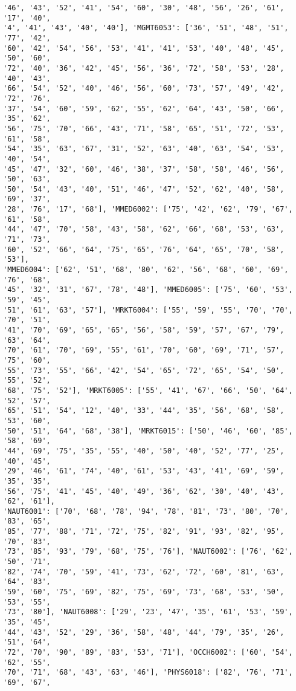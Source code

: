 \documentclass[11pt]{article}
\begin{document}
\begin{Verbatim}[commandchars=\\\{\}]
'46', '43', '52', '41', '54', '60', '30', '48', '56', '26', '61', '17', '40',
'4', '41', '43', '40', '40'], 'MGMT6053': ['36', '51', '48', '51', '77', '42',
'60', '42', '54', '56', '53', '41', '41', '53', '40', '48', '45', '50', '60',
'72', '40', '36', '42', '45', '56', '36', '72', '58', '53', '28', '40', '43',
'66', '54', '52', '40', '46', '56', '60', '73', '57', '49', '42', '72', '76',
'37', '54', '60', '59', '62', '55', '62', '64', '43', '50', '66', '35', '62',
'56', '75', '70', '66', '43', '71', '58', '65', '51', '72', '53', '61', '58',
'54', '35', '63', '67', '31', '52', '63', '40', '63', '54', '53', '40', '54',
'45', '47', '32', '60', '46', '38', '37', '58', '58', '46', '56', '50', '63',
'50', '54', '43', '40', '51', '46', '47', '52', '62', '40', '58', '69', '37',
'28', '76', '17', '68'], 'MMED6002': ['75', '42', '62', '79', '67', '61', '58',
'44', '47', '70', '58', '43', '58', '62', '66', '68', '53', '63', '71', '73',
'60', '52', '66', '64', '75', '65', '76', '64', '65', '70', '58', '53'],
'MMED6004': ['62', '51', '68', '80', '62', '56', '68', '60', '69', '76', '68',
'45', '32', '31', '67', '78', '48'], 'MMED6005': ['75', '60', '53', '59', '45',
'51', '61', '63', '57'], 'MRKT6004': ['55', '59', '55', '70', '70', '70', '51',
'41', '70', '69', '65', '65', '56', '58', '59', '57', '67', '79', '63', '64',
'70', '61', '70', '69', '55', '61', '70', '60', '69', '71', '57', '75', '60',
'55', '73', '55', '66', '42', '54', '65', '72', '65', '54', '50', '55', '52',
'68', '75', '52'], 'MRKT6005': ['55', '41', '67', '66', '50', '64', '52', '57',
'65', '51', '54', '12', '40', '33', '44', '35', '56', '68', '58', '53', '60',
'50', '51', '64', '68', '38'], 'MRKT6015': ['50', '46', '60', '85', '58', '69',
'44', '69', '75', '35', '55', '40', '50', '40', '52', '77', '25', '40', '45',
'29', '46', '61', '74', '40', '61', '53', '43', '41', '69', '59', '35', '35',
'56', '75', '41', '45', '40', '49', '36', '62', '30', '40', '43', '62', '61'],
'NAUT6001': ['70', '68', '78', '94', '78', '81', '73', '80', '70', '83', '65',
'85', '77', '88', '71', '72', '75', '82', '91', '93', '82', '95', '70', '83',
'73', '85', '93', '79', '68', '75', '76'], 'NAUT6002': ['76', '62', '50', '71',
'82', '74', '70', '59', '41', '73', '62', '72', '60', '81', '63', '64', '83',
'59', '60', '75', '69', '82', '75', '69', '73', '68', '53', '50', '53', '55',
'73', '80'], 'NAUT6008': ['29', '23', '47', '35', '61', '53', '59', '35', '45',
'44', '43', '52', '29', '36', '58', '48', '44', '79', '35', '26', '51', '64',
'72', '70', '90', '89', '83', '53', '71'], 'OCCH6002': ['60', '54', '62', '55',
'70', '71', '68', '43', '63', '46'], 'PHYS6018': ['82', '76', '71', '69', '67',

\end{Verbatim}
\end{document}
